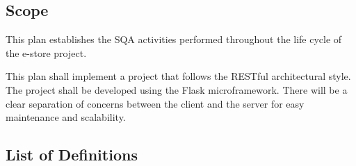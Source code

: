 \documentclass[12pt,letterpaper, margin=1in]{article}
\begin{document}
\subsection{Scope}
This plan establishes the SQA activities performed throughout the life cycle of the e-store project.

This plan shall implement a project that follows the RESTful architectural style. The project shall be developed using the Flask microframework. There will be a clear separation of concerns between the client and the server for easy maintenance and scalability.

\newpage

\subsection{List of Definitions}
\end{document}
